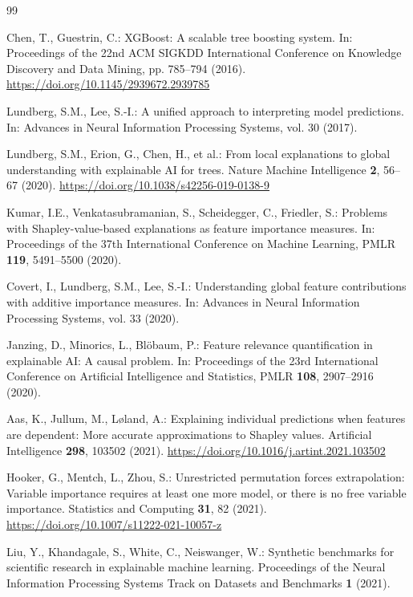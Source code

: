 \documentclass[runningheads]{llncs}
\begin{document}
\begin{thebibliography}{99}

Chen, T., Guestrin, C.:
XGBoost: A scalable tree boosting system.
In: Proceedings of the 22nd ACM SIGKDD International Conference on Knowledge Discovery and
Data Mining, pp. 785--794 (2016).
\url{https://doi.org/10.1145/2939672.2939785}

Lundberg, S.M., Lee, S.-I.:
A unified approach to interpreting model predictions.
In: Advances in Neural Information Processing Systems, vol. 30 (2017).

Lundberg, S.M., Erion, G., Chen, H., et al.:
From local explanations to global understanding with explainable AI for trees.
Nature Machine Intelligence \textbf{2}, 56--67 (2020).
\url{https://doi.org/10.1038/s42256-019-0138-9}

Kumar, I.E., Venkatasubramanian, S., Scheidegger, C., Friedler, S.:
Problems with Shapley-value-based explanations as feature importance measures.
In: Proceedings of the 37th International Conference on Machine Learning,
PMLR \textbf{119}, 5491--5500 (2020).

Covert, I., Lundberg, S.M., Lee, S.-I.:
Understanding global feature contributions with additive importance measures.
In: Advances in Neural Information Processing Systems, vol. 33 (2020).

Janzing, D., Minorics, L., Bl{\"o}baum, P.:
Feature relevance quantification in explainable AI: A causal problem.
In: Proceedings of the 23rd International Conference on Artificial Intelligence and Statistics,
PMLR \textbf{108}, 2907--2916 (2020).

Aas, K., Jullum, M., L{\o}land, A.:
Explaining individual predictions when features are dependent: More accurate approximations to
Shapley values.
Artificial Intelligence \textbf{298}, 103502 (2021).
\url{https://doi.org/10.1016/j.artint.2021.103502}

Hooker, G., Mentch, L., Zhou, S.:
Unrestricted permutation forces extrapolation: Variable importance requires at least one more
model, or there is no free variable importance.
Statistics and Computing \textbf{31}, 82 (2021).
\url{https://doi.org/10.1007/s11222-021-10057-z}

Liu, Y., Khandagale, S., White, C., Neiswanger, W.:
Synthetic benchmarks for scientific research in explainable machine learning.
Proceedings of the Neural Information Processing Systems Track on Datasets and Benchmarks
\textbf{1} (2021).


\end{thebibliography}
\end{document}
